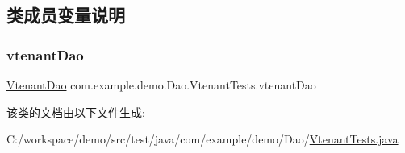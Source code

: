 \subsection{类成员变量说明}
\mbox{\label{classcom_1_1example_1_1demo_1_1_dao_1_1_vtenant_tests_ace4939e8892385b22e928448ea7ec5a5}} 
\subsubsection{\texorpdfstring{vtenant\+Dao}{vtenantDao}}
{\footnotesize\ttfamily \mbox{\hyperlink{interfacecom_1_1example_1_1demo_1_1dao_1_1_vtenant_dao}{Vtenant\+Dao}} com.\+example.\+demo.\+Dao.\+Vtenant\+Tests.\+vtenant\+Dao\hspace{0.3cm}{\ttfamily [private]}}



该类的文档由以下文件生成\+:\begin{DoxyCompactItemize}
\item 
C\+:/workspace/demo/src/test/java/com/example/demo/\+Dao/\mbox{\hyperlink{_vtenant_tests_8java}{Vtenant\+Tests.\+java}}\end{DoxyCompactItemize}
